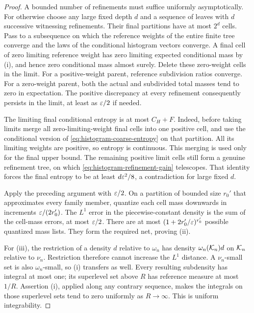 \begin{proof}
A bounded number of refinements must suffice uniformly asymptotically.
For otherwise choose any large fixed depth $d$ and a sequence of
leaves with $d$ successive witnessing refinements. Their final
partitions have at most $2^d$ cells. Pass to a subsequence on which the
reference weights of the entire finite tree converge and the laws of
the conditional histogram vectors converge. A final cell of zero
limiting reference weight has zero limiting expected conditional mass
by (i), and hence zero conditional mass almost surely. Delete these
zero-weight cells in the limit. For a positive-weight parent, reference
subdivision ratios converge. For a zero-weight parent, both the actual
and subdivided total masses tend to zero in expectation. The positive
discrepancy at every refinement consequently persists in the limit,
at least as $\varepsilon/2$ if needed.

The limiting final conditional entropy is at most $C_H+F$. Indeed,
before taking limits merge all zero-limiting-weight final cells into
one positive cell, and use the conditional version of
\eqref{eq:histogram-coarse-entropy} on that partition. All its limiting
weights are positive, so entropy is continuous. This merging is used
only for the final upper bound. The remaining positive limit cells
still form a genuine refinement tree, on which
\eqref{eq:histogram-refinement-gain} telescopes. That identity forces
the final entropy to be at least $d\varepsilon^2/8$, a contradiction for large
fixed $d$.

Apply the preceding argument with $\varepsilon/2$. On a partition of bounded
size $r_0'$ that approximates every family member, quantize each cell
mass downwards in increments $\varepsilon/(2r_0')$. The $L^1$ error in the
piecewise-constant density is the sum of the cell-mass errors, at most
$\varepsilon/2$. There are at most
$(1+2r_0'/\varepsilon)^{r_0'}$ possible quantized mass lists. They form the
required net, proving (ii).

For (iii), the restriction of a density $d$ relative to $\omega_n$ has
density $\omega_n(\mathcal K_n)d$ on $\mathcal K_n$ relative to $\nu_n$. Restriction
therefore cannot increase the $L^1$ distance. A $\nu_n$-small set is
also $\omega_n$-small, so (i) transfers as well. Every resulting
subdensity has integral at most one; its superlevel set above $R$ has
reference measure at most $1/R$. Assertion (i), applied along any
contrary sequence, makes the integrals on those superlevel sets tend
to zero uniformly as $R\to\infty$. This is uniform integrability.
\end{proof}

